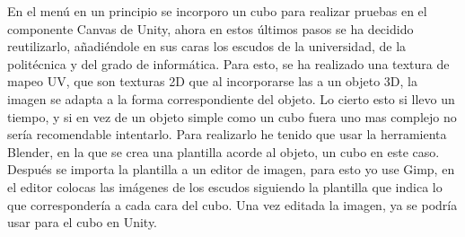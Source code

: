 En el menú en un principio se incorporo un cubo para realizar pruebas en el componente Canvas de Unity, ahora en estos últimos pasos se ha decidido reutilizarlo, añadiéndole en sus caras los escudos de la universidad, de la politécnica y del grado de informática. Para esto, se ha realizado una textura de mapeo UV, que son texturas 2D que al incorporarse las a un objeto 3D, la imagen se adapta a la forma correspondiente del objeto. Lo cierto esto si llevo un tiempo, y si en vez de un objeto simple como un cubo fuera uno mas complejo no sería recomendable intentarlo. Para realizarlo he tenido que usar la herramienta Blender, en la que se crea una plantilla acorde al objeto, un cubo en este caso. Después se importa la plantilla a un editor de imagen, para esto yo use Gimp, en el editor colocas las imágenes de los escudos siguiendo la plantilla que indica lo que correspondería a cada cara del cubo. Una vez editada la imagen, ya se podría usar para el cubo en Unity.

